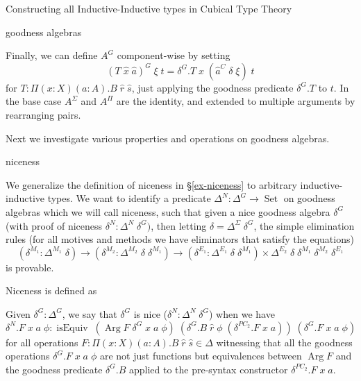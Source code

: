 \documentclass[acmsmall,review]{acmart}\settopmatter{printfolios=true,printccs=false,printacmref=false}
\DeclareMathOperator{\USet}{Set}
\DeclareMathOperator{\isEquiv}{isEquiv}
\DeclareMathOperator{\Arg}{Arg}
\begin{document}
\begin{section}{Constructing all Inductive-Inductive types in Cubical Type Theory}
\begin{subsection}{goodness algebras}
\begin{definition}
Finally, we can define $A^G$ component-wise by setting \[(T\;\hat{x}\;\hat{a})^G\;\xi\;t = \delta^G.T\;\hat{x}\;(\hat{a}^C\;\delta\;\xi)\;t\] for $T : \Pi(x : X)(a : A).B\;\hat{r}\;\hat{s}$, just applying the goodness predicate $\delta^G.T$ to $t$. In the base case $A^\Sigma$ and $A^\Pi$ are the identity, and extended to multiple arguments by rearranging pairs.

\end{definition}

Next we investigate various properties and operations on goodness algebras.

\end{subsection}
\begin{subsection}{niceness}\label{niceness}

We generalize the definition of niceness in \S\ref{ex-niceness} to arbitrary inductive-inductive types.
We want to identify a predicate $\Delta^N : \Delta^G \to \USet$ on goodness algebras which we will call niceness, such that given a nice goodness algebra $\delta^G$ (with proof of niceness $\delta^N : \Delta^N\;\delta^G)$, then letting $\delta = \Delta^\Sigma\;\delta^G$, the simple elimination rules (for all motives and methods we have eliminators that satisfy the equations)
\[(\delta^{M_1} : \Delta^{M_1}\;\delta) \to (\delta^{M_2} : \Delta^{M_2}\;\delta\;\delta^{M_1}) \to (\delta^{E_1} : \Delta^{E_1}\;\delta\;\delta^{M_1}) \times \Delta^{E_2}\;\delta\;\delta^{M_1}\;\delta^{M_2}\;\delta^{E_1}\] is provable.

Niceness is defined as
\begin{definition}
Given $\delta^G : \Delta^G$, we say that $\delta^G$ is nice ($\delta^N : \Delta^N\;\delta^G$) when we have \[\delta^N.F\;x\;a\;\phi : \isEquiv\; (\Arg F\;\delta^G\;x\;a\;\phi)\;(\delta^G.B\;\hat{r}\;\phi\;(\delta^{PC_2}.F\;x\;a))\;(\delta^G.F\;x\;a\;\phi)\] for all operations $F : \Pi(x : X)(a : A).B\;\hat{r}\;\hat{s}\in\Delta$ witnessing that all the goodness operations $\delta^G.F\;x\;a\;\phi$ are not just functions but equivalences between $\Arg F$ and the goodness predicate $\delta^G.B$ applied to the pre-syntax constructor $\delta^{PC_2}.F\;x\;a$.
\end{definition}


\end{subsection}
\end{section}
\end{document}
